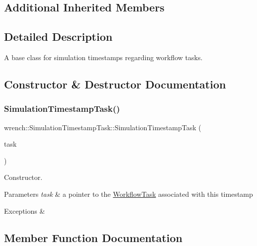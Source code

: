 \subsection*{Additional Inherited Members}


\subsection{Detailed Description}
A base class for simulation timestamps regarding workflow tasks. 

\subsection{Constructor \& Destructor Documentation}
\mbox{\label{classwrench_1_1_simulation_timestamp_task_a775bc576001c6a4c94e9ce33890e3aa0}} 
\subsubsection{\texorpdfstring{Simulation\+Timestamp\+Task()}{SimulationTimestampTask()}}
{\footnotesize\ttfamily wrench\+::\+Simulation\+Timestamp\+Task\+::\+Simulation\+Timestamp\+Task (\begin{DoxyParamCaption}\item[{\hyperlink{classwrench_1_1_workflow_task}{Workflow\+Task} $\ast$}]{task }\end{DoxyParamCaption})}



Constructor. 


\begin{DoxyParams}{Parameters}
{\em task} & a pointer to the \hyperlink{classwrench_1_1_workflow_task}{Workflow\+Task} associated with this timestamp \\
\hline
\end{DoxyParams}

\begin{DoxyExceptions}{Exceptions}
{\em } & \\
\hline
\end{DoxyExceptions}


\subsection{Member Function Documentation}
\mbox{\label{classwrench_1_1_simulation_timestamp_task_af8e8da0d1710e20f4e517852c53cb1f2}} 
